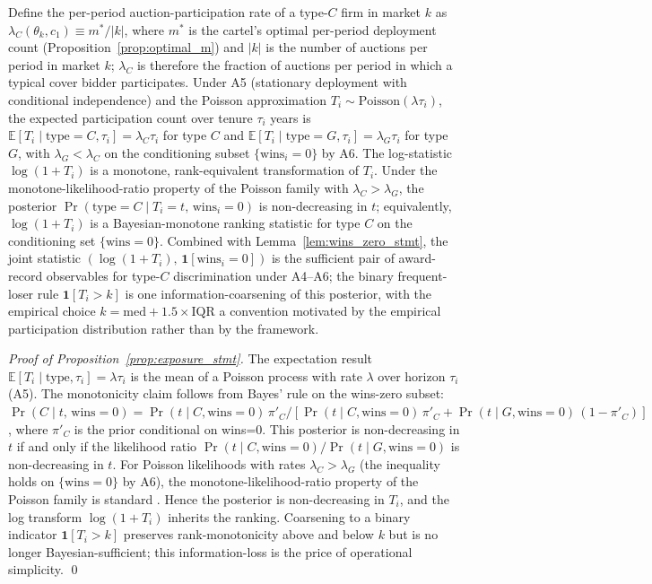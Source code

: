 \begin{proposition}\label{prop:exposure_stmt}
Define the per-period auction-participation rate of a type-$C$
firm in market $k$ as
$\lambda_C(\theta_k, c_1) \equiv m^* / |k|$, where $m^*$ is the
cartel's optimal per-period deployment count
(Proposition~\ref{prop:optimal_m}) and $|k|$ is the number of
auctions per period in market $k$; $\lambda_C$ is therefore the
fraction of auctions per period in which a typical cover bidder
participates. Under A5 (stationary deployment with conditional
independence) and the Poisson approximation
$T_i \sim \mathrm{Poisson}(\lambda \tau_i)$, the expected
participation count over tenure $\tau_i$ years is
$\mathbb{E}[T_i \mid \text{type}=C, \tau_i] =
\lambda_C \tau_i$ for type $C$ and
$\mathbb{E}[T_i \mid \text{type}=G, \tau_i] =
\lambda_G \tau_i$ for type $G$, with $\lambda_G < \lambda_C$ on
the conditioning subset $\{\text{wins}_i = 0\}$ by A6. The
log-statistic $\log(1+T_i)$ is a monotone, rank-equivalent
transformation of $T_i$. Under the monotone-likelihood-ratio
property of the Poisson family with $\lambda_C > \lambda_G$,
the posterior $\Pr(\text{type}=C \mid T_i = t,\,\text{wins}_i =
0)$ is non-decreasing in $t$; equivalently, $\log(1+T_i)$ is a
Bayesian-monotone ranking statistic for type $C$ on the
conditioning set $\{\text{wins} = 0\}$. Combined with
Lemma~\ref{lem:wins_zero_stmt}, the joint statistic
$(\log(1+T_i),\,\mathbf{1}[\text{wins}_i = 0])$ is the
sufficient pair of award-record observables for type-$C$
discrimination under A4--A6; the binary frequent-loser rule
$\mathbf{1}[T_i > k]$ is one information-coarsening of this
posterior, with the empirical choice
$k = \mathrm{med} + 1.5 \times \mathrm{IQR}$ a convention
motivated by the empirical participation distribution rather
than by the framework.
\end{proposition}

\begin{proof}[Proof of Proposition~\ref{prop:exposure_stmt}]
The expectation result $\mathbb{E}[T_i \mid \text{type},
\tau_i] = \lambda \tau_i$ is the mean of a Poisson process with
rate $\lambda$ over horizon $\tau_i$ (A5). The monotonicity
claim follows from Bayes' rule on the wins-zero subset:
$\Pr(C \mid t,\,\text{wins} = 0) = \Pr(t \mid C, \text{wins} = 0)
\,\pi'_C / [\Pr(t \mid C, \text{wins} = 0)\,\pi'_C +
\Pr(t \mid G, \text{wins} = 0)\,(1 - \pi'_C)]$, where $\pi'_C$
is the prior conditional on wins=0. This posterior is
non-decreasing in $t$ if and only if the likelihood ratio
$\Pr(t \mid C, \text{wins}=0)/\Pr(t \mid G, \text{wins}=0)$ is
non-decreasing in $t$. For Poisson likelihoods with rates
$\lambda_C > \lambda_G$ (the inequality holds on
$\{\text{wins} = 0\}$ by A6), the monotone-likelihood-ratio
property of the Poisson family is standard
\citep{karlin1956mlr}. Hence the posterior is non-decreasing in
$T_i$, and the log transform $\log(1 + T_i)$ inherits the
ranking. Coarsening to a binary indicator
$\mathbf{1}[T_i > k]$ preserves rank-monotonicity above and
below $k$ but is no longer Bayesian-sufficient; this
information-loss is the price of operational simplicity. \qed
\end{proof}


